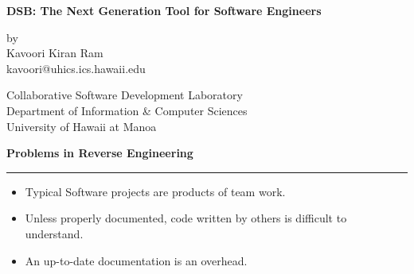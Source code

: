 
%
\newcommand{\horizontalline} {\rule{\textwidth}{.02in}} 
\pagestyle{empty}

      

\begin{slide} \Huge
    \begin{center}
    {\bf DSB: The Next Generation Tool for Software Engineers}
    
    \vspace{0.5in}
    
    by\\
    Kavoori Kiran Ram\\
    {\sf kavoori@uhics.ics.hawaii.edu}
    
    \vspace{0.5in}
    
    Collaborative Software Development Laboratory \\
    Department of Information \& Computer Sciences\\
    University of Hawaii at Manoa
  \end{center}
\end{slide}  \Huge


\begin{slide} \Huge 
  {\bf Problems in Reverse Engineering }
  \horizontalline
  
  \begin{itemize}
  \item Typical Software projects are products of team work.
    
  \item Unless properly documented, code written by others is
  difficult to understand.
    
  \item An up-to-date documentation is an overhead.
  \end{itemize}
\end{slide} \Huge 



